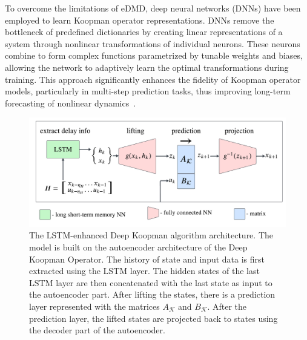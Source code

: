 \documentclass[conference]{IEEEtran}
\begin{document}
To overcome the limitations of eDMD, deep neural networks (DNNs) have been employed to learn Koopman operator representations. DNNs remove the bottleneck of predefined dictionaries by creating linear representations of a system through nonlinear transformations of individual neurons. These neurons combine to form complex functions parametrized by tunable weights and biases, allowing the network to adaptively learn the optimal transformations during training. This approach significantly enhances the fidelity of Koopman operator models, particularly in multi-step prediction tasks, thus improving long-term forecasting of nonlinear dynamics~\cite{Yeung2019}.
\begin{figure}
    \centerline{\includegraphics[width = \linewidth]{figures/derek_scheme.pdf}}
    \caption{The LSTM-enhanced Deep Koopman algorithm architecture. The model is built on the autoencoder architecture of the Deep Koopman Operator. The history of state and input data is first extracted using the LSTM layer. The hidden states of the last LSTM layer are then concatenated with the last state as input to the autoencoder part. After lifting the states, there is a prediction layer represented with the matrices \(A_\mathcal{K}\) and \(B_\mathcal{K}\). After the prediction layer, the lifted states are projected back to states using the decoder part of the autoencoder.}
    \label{fig:introduction:LSTM-enhanced_deep_koopman_scheme}
\end{figure}
\end{document}
